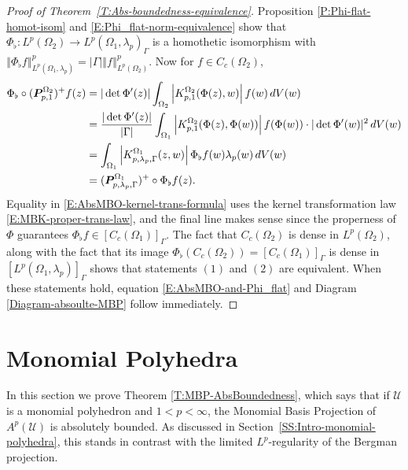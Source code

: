 \documentclass[letterpaper,11pt,reqno]{amsart}
\theoremstyle{plain}
\theoremstyle{definition}
\theoremstyle{remark}
\theoremstyle{remark}
\numberwithin{equation}{section}
\newcommand{\abs}[1]{\left\vert#1\right\vert}
\newcommand{\norm}[1]{\left\Vert#1\right\Vert}
\newcommand{\Uu}{\mathscr{U}}
\begin{document}
\begin{proof}[Proof of Theorem~\ref{T:Abs-boundedness-equivalence}]
Proposition \ref{P:Phi-flat-homot-isom} and \eqref{E:Phi_flat-norm-equivalence} show that $\Phi_\flat: L^p(\Omega_2) \to L^p(\Omega_1,\lambda_p)_\Gamma$ is a homothetic isomorphism with $\norm{\Phi_\flat f}^p_{L^p(\Omega_1,\lambda_p)} = |\Gamma| \norm{f}^p_{L^p(\Omega_2)}$. Now for $f \in C_c(\Omega_2)$,
\begin{align}
    \Phi_\flat \circ (\bm{P}^{\Omega_2}_{p,1})^+ f (z) &= |\det \Phi'(z)| \int_{\Omega_2}  \abs{K^{\Omega_2}_{p,1}(\Phi(z),w)} f(w)\,dV(w) \notag\\
    &= \frac{|\det \Phi'(z)|}{|\Gamma| } \int_{\Omega_1} \abs{K^{\Omega_2}_{p,1}(\Phi(z),\Phi(w))}f(\Phi(w))  \cdot |\det \Phi'(w)|^2 \,dV(w) \notag \\
    &= \int_{\Omega_1} \abs{K^{\Omega_1}_{p,\lambda_p,\Gamma}(z,w)}\Phi_\flat f(w) \lambda_p(w)\,dV(w) \label{E:AbsMBO-kernel-trans-formula}\\
    &= (\bm{P}^{\Omega_1}_{p,\lambda_p,\Gamma})^+ \circ \Phi_\flat f (z) \notag.
\end{align}
Equality in \eqref{E:AbsMBO-kernel-trans-formula} uses the kernel transformation law \eqref{E:MBK-proper-trans-law}, and the final line makes sense since the properness of $\Phi$ guarantees $\Phi_\flat f \in \left[C_c(\Omega_1)\right]_\Gamma$.
The fact that $C_c(\Omega_2)$ is dense in $ L^p(\Omega_2)$, along with the fact that its image $\Phi_\flat\left(C_c(\Omega_2)\right) = \left[C_c(\Omega_1)\right]_\Gamma$ is dense in $\left[L^p(\Omega_1,\lambda_p) \right]_\Gamma$ shows that statements $(1)$ and $(2)$ are equivalent.  
When these statements hold, equation \eqref{E:AbsMBO-and-Phi_flat} and Diagram \eqref{Diagram-absoulte-MBP} follow immediately.
\end{proof}


\section{Monomial Polyhedra}\label{S:MonomialPolyhedra}

In this section we prove Theorem \ref{T:MBP-AbsBoundedness}, which says that if $\Uu$ is a monomial polyhedron and $1<p<\infty$, the Monomial Basis Projection of $A^p(\Uu)$ is absolutely bounded.
As discussed in Section~\ref{SS:Intro-monomial-polyhedra}, this stands in contrast with the limited $L^p$-regularity of the Bergman projection.
\end{document}

